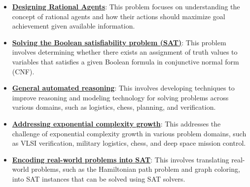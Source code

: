 \documentclass{article}%
\begin{document}
\begin{itemize}[leftmargin=*]
\item \href{https://purdue.brightspace.com/d2l/common/assets/pdfjs-d2l-dist/1.0.14-legacy/web/viewer.html?file=\%2Fcontent\%2Fenforced\%2F1095467-wl.202510.CS.24300.001\%2F14L1-DepthFS.pdf\%3Fou\%3D1095467\&lang=en-us\&container=d2l-fileviewer-rendered-pdf\&fullscreen=d2l-fileviewer-rendered-pdf-dialog\&height=667#page=39}{\textbf{Designing Rational Agents}}: This problem focuses on understanding the concept of rational agents and how their actions should maximize goal achievement given available information.%
\end{itemize}%
\begin{itemize}[leftmargin=*]%
\item \href{https://purdue.brightspace.com/d2l/common/assets/pdfjs-d2l-dist/1.0.14-legacy/web/viewer.html?file=\%2Fcontent\%2Fenforced\%2F1095467-wl.202510.CS.24300.001\%2F15L2-SAT.pdf\%3Fou\%3D1095467\&lang=en-us\&container=d2l-fileviewer-rendered-pdf\&fullscreen=d2l-fileviewer-rendered-pdf-dialog\&height=667#page=2}{\textbf{Solving the Boolean satisfiability problem (SAT)}}: This problem involves determining whether there exists an assignment of truth values to variables that satisfies a given Boolean formula in conjunctive normal form (CNF).%
\item \href{https://purdue.brightspace.com/d2l/common/assets/pdfjs-d2l-dist/1.0.14-legacy/web/viewer.html?file=\%2Fcontent\%2Fenforced\%2F1095467-wl.202510.CS.24300.001\%2F15L2-SAT.pdf\%3Fou\%3D1095467\&lang=en-us\&container=d2l-fileviewer-rendered-pdf\&fullscreen=d2l-fileviewer-rendered-pdf-dialog\&height=667#page=3}{\textbf{General automated reasoning}}: This involves developing techniques to improve reasoning and modeling technology for solving problems across various domains, such as logistics, chess, planning, and verification.%
\item \href{https://purdue.brightspace.com/d2l/common/assets/pdfjs-d2l-dist/1.0.14-legacy/web/viewer.html?file=\%2Fcontent\%2Fenforced\%2F1095467-wl.202510.CS.24300.001\%2F15L2-SAT.pdf\%3Fou\%3D1095467\&lang=en-us\&container=d2l-fileviewer-rendered-pdf\&fullscreen=d2l-fileviewer-rendered-pdf-dialog\&height=667#page=4}{\textbf{Addressing exponential complexity growth}}: This addresses the challenge of exponential complexity growth in various problem domains, such as VLSI verification, military logistics, chess, and deep space mission control.%
\item \href{https://purdue.brightspace.com/d2l/common/assets/pdfjs-d2l-dist/1.0.14-legacy/web/viewer.html?file=\%2Fcontent\%2Fenforced\%2F1095467-wl.202510.CS.24300.001\%2F15L2-SAT.pdf\%3Fou\%3D1095467\&lang=en-us\&container=d2l-fileviewer-rendered-pdf\&fullscreen=d2l-fileviewer-rendered-pdf-dialog\&height=667#page=40}{\textbf{Encoding real{-}world problems into SAT}}: This involves translating real-world problems, such as the Hamiltonian path problem and graph coloring, into SAT instances that can be solved using SAT solvers.%
\end{itemize}%
\end{document}
